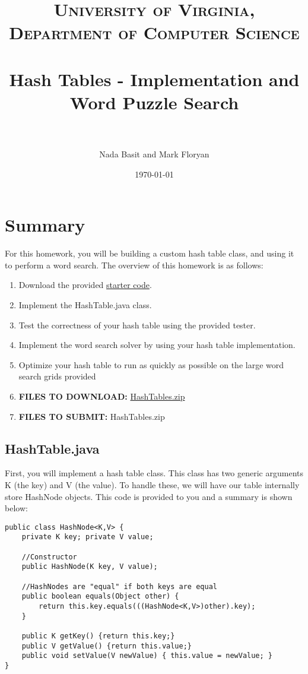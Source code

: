 \documentclass[paper=a4, fontsize=11pt, parskip=full]{scrartcl} %
\title{
\normalfont \normalsize
\textsc{University of Virginia, Department of Computer Science} \\ [25pt] %
\horrule{0.5pt} \\[0.4cm] %
\huge Hash Tables - Implementation and Word Puzzle Search \\ %
\horrule{2pt} \\[0.5cm] %
}
\author{Nada Basit and Mark Floryan}
\date{\normalsize\today} %
\numberwithin{equation}{section} %
\numberwithin{figure}{section} %
\numberwithin{table}{section} %
\begin{document}
\maketitle %


\section{Summary}

For this homework, you will be building a custom hash table class, and using it to perform a word search. The overview of this homework is as follows:

\begin{enumerate}
	\item Download the provided \href{https://uva-cs.github.io/dsa1/homeworks/HashTables/code/HashTables.zip}{starter code}.
	\item Implement the HashTable.java class.
	\item Test the correctness of your hash table using the provided tester.
	\item Implement the word search solver by using your hash table implementation.
	\item Optimize your hash table to run as quickly as possible on the large word search grids provided
	\item \textbf{FILES TO DOWNLOAD:} \href{https://uva-cs.github.io/dsa1/homeworks/HashTables/code/HashTables.zip}{HashTables.zip}
	\item \textbf{FILES TO SUBMIT:} HashTables.zip
\end{enumerate}


\subsection{HashTable.java}

First, you will implement a hash table class. This class has two generic arguments K (the key) and V (the value). To handle these, we will have our table internally store HashNode objects. This code is provided to you and a summary is shown below:

\begin{lstlisting}
public class HashNode<K,V> {
	private K key; private V value;
	
	//Constructor
	public HashNode(K key, V value);
	
	//HashNodes are "equal" if both keys are equal
	public boolean equals(Object other) {
		return this.key.equals(((HashNode<K,V>)other).key);
	}
	
	public K getKey() {return this.key;}
	public V getValue() {return this.value;}
	public void setValue(V newValue) { this.value = newValue; }
}
\end{lstlisting}
\end{document}
